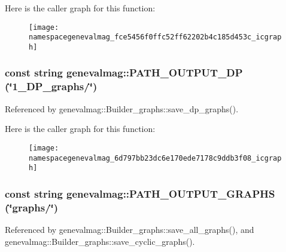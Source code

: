 Here is the caller graph for this function:\nopagebreak
\begin{figure}[H]
\begin{center}
\leavevmode
\texttt{[image: namespacegenevalmag\_fce5456f0ffc52ff62202b4c185d453c\_icgraph]}
\end{center}
\end{figure}
\hypertarget{namespacegenevalmag_6d797bb23dc6e170ede7178c9ddb3f08}{
\subsubsection[{PATH\_\-OUTPUT\_\-DP}]{\setlength{\rightskip}{0pt plus 5cm}const string genevalmag::PATH\_\-OUTPUT\_\-DP (\char`\"{}1\_\-DP\_\-graphs/\char`\"{})}}
\label{namespacegenevalmag_6d797bb23dc6e170ede7178c9ddb3f08}




Referenced by genevalmag::Builder\_\-graphs::save\_\-dp\_\-graphs().

Here is the caller graph for this function:\nopagebreak
\begin{figure}[H]
\begin{center}
\leavevmode
\texttt{[image: namespacegenevalmag\_6d797bb23dc6e170ede7178c9ddb3f08\_icgraph]}
\end{center}
\end{figure}
\hypertarget{namespacegenevalmag_306e982e69207c606c1d6f236259b4e1}{
\subsubsection[{PATH\_\-OUTPUT\_\-GRAPHS}]{\setlength{\rightskip}{0pt plus 5cm}const string genevalmag::PATH\_\-OUTPUT\_\-GRAPHS (\char`\"{}graphs/\char`\"{})}}
\label{namespacegenevalmag_306e982e69207c606c1d6f236259b4e1}




Referenced by genevalmag::Builder\_\-graphs::save\_\-all\_\-graphs(), and genevalmag::Builder\_\-graphs::save\_\-cyclic\_\-graphs().


